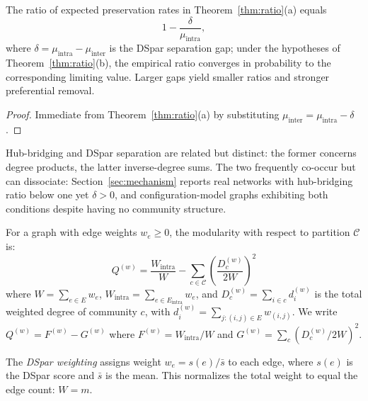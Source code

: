 \begin{corollary}
The ratio of expected preservation rates in Theorem~\ref{thm:ratio}(a) equals
\begin{equation}
1 - \frac{\delta}{\mu_{\text{intra}}},
\end{equation}
where $\delta = \mu_{\text{intra}} - \mu_{\text{inter}}$ is the DSpar separation gap; under the hypotheses of Theorem~\ref{thm:ratio}(b), the empirical ratio converges in probability to the corresponding limiting value. Larger gaps yield smaller ratios and stronger preferential removal.
\end{corollary}

\begin{proof}
Immediate from Theorem~\ref{thm:ratio}(a) by substituting $\mu_{\text{inter}} = \mu_{\text{intra}} - \delta$.
\end{proof}

\begin{remark}
Hub-bridging and DSpar separation are related but distinct: the former concerns degree products, the latter inverse-degree sums. The two frequently co-occur but can dissociate: Section~\ref{sec:mechanism} reports real networks with hub-bridging ratio below one yet $\delta > 0$, and configuration-model graphs exhibiting both conditions despite having no community structure.
\end{remark}

\begin{definition}
For a graph with edge weights $w_e \geq 0$, the modularity with respect to partition $\mathcal{C}$ is:
\begin{equation}
Q^{(w)} = \frac{W_{\text{intra}}}{W} - \sum_{c \in \mathcal{C}} \left( \frac{D_c^{(w)}}{2W} \right)^2
\end{equation}
where $W = \sum_{e \in E} w_e$, $W_{\text{intra}} = \sum_{e \in E_{\text{intra}}} w_e$, and $D_c^{(w)} = \sum_{i \in c} d_i^{(w)}$ is the total weighted degree of community $c$, with $d_i^{(w)} = \sum_{j: (i,j) \in E} w_{(i,j)}$.
We write $Q^{(w)} = F^{(w)} - G^{(w)}$ where $F^{(w)} = W_{\text{intra}}/W$ and $G^{(w)} = \sum_c (D_c^{(w)}/2W)^2$.
\end{definition}

\begin{definition}
The \emph{DSpar weighting} assigns weight $w_e = s(e)/\bar{s}$ to each edge, where $s(e)$ is the DSpar score and $\bar{s}$ is the mean. This normalizes the total weight to equal the edge count: $W = m$.
\end{definition}

